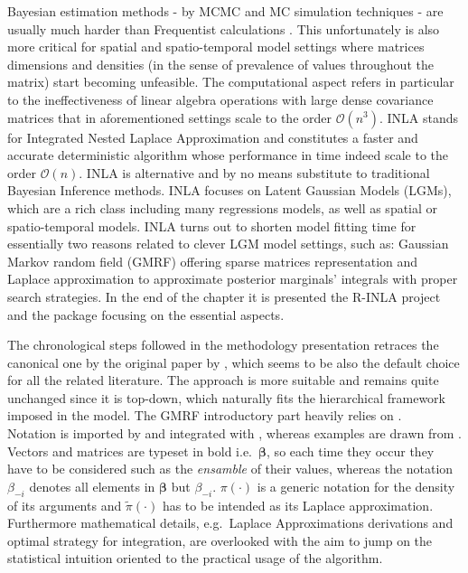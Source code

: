 \documentclass[
  12pt,
  a4paper,
  oneside]{book}
\theoremstyle{definition}
\theoremstyle{definition}
\theoremstyle{definition}
\theoremstyle{remark}
\begin{document}
Bayesian estimation methods - by MCMC \citep{mcmc} and MC simulation techniques - are usually much harder than Frequentist calculations \citep{wang2018bayesian}. This unfortunately is also more critical for spatial and spatio-temporal model settings \citep{Cameletti2012} where matrices dimensions and densities (in the sense of prevalence of values throughout the matrix) start becoming unfeasible.
The computational aspect refers in particular to the ineffectiveness of linear algebra operations with large dense covariance matrices that in aforementioned settings scale to the order \(\mathcal{O}(n^3)\).
INLA \citep{Rue2009, Rue2017} stands for Integrated Nested Laplace Approximation and constitutes a faster and accurate deterministic algorithm whose performance in time indeed scale to the order \(\mathcal{O}(n)\). INLA is alternative and by no means substitute \citep{YT:Rue} to traditional Bayesian Inference methods. INLA focuses on Latent Gaussian Models (LGMs)\citeyearpar{wang2018bayesian}, which are a rich class including many regressions models, as well as spatial or spatio-temporal models.
INLA turns out to shorten model fitting time for essentially two reasons related to clever LGM model settings, such as: Gaussian Markov random field (GMRF) offering sparse matrices representation and Laplace approximation to approximate posterior marginals' integrals with proper search strategies.
In the end of the chapter it is presented the R-INLA project and the package focusing on the essential aspects.

The chronological steps followed in the methodology presentation retraces the canonical one by the original paper by \citet{Rue2009}, which seems to be also the default choice for all the related literature. The approach is more suitable and remains quite unchanged since it is top-down, which naturally fits the hierarchical framework imposed in the model. The GMRF introductory part heavily relies on \citet{GMRFRue}.\\
Notation is imported by \citet{Blangiardo-Cameletti} and integrated with \citet{Bayesian_INLA_Rubio}, whereas examples are drawn from \citet{wang2018bayesian}. Vectors and matrices are typeset in bold i.e.~\(\boldsymbol{\beta}\), so each time they occur they have to be considered such as the \emph{ensamble} of their values, whereas the notation \(\beta_{-i}\) denotes all elements in \(\boldsymbol{\beta}\) but \(\beta_{-i}\).
\(\pi(\cdot)\) is a generic notation for the density of its arguments and \(\tilde\pi(\cdot)\) has to be intended as its Laplace approximation. Furthermore mathematical details, e.g.~Laplace Approximations derivations and optimal strategy for integration, are overlooked with the aim to jump on the statistical intuition oriented to the practical usage of the algorithm.
\end{document}
